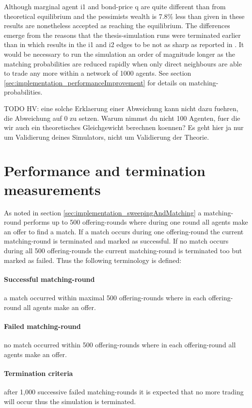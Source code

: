\documentclass[Bachelorarbeit.tex]{subfiles}
\begin{document}
Although marginal agent i1 and bond-price q are quite different than from theoretical equilibrium and the pessimists wealth is 7.8\% less than given in \cite{Breuer2015} these results are nonetheless accepted as reaching the equilibrium. The differences emerge from the reasons that the thesis-simulation runs were terminated earlier than in \cite{Breuer2015} which results in the i1 and i2 edges to be not as sharp as reported in \cite{Breuer2015}. It would be necessary to run the simulation an order of magnitude longer as the matching probabilities are reduced rapidly when only direct neighbours are able to trade any more within a network of 1000 agents. See section \ref{sec:implementation_performanceImprovement} for details on matching-probabilities.

TODO HV: eine solche Erklaerung einer Abweichung kann nicht dazu fuehren, die Abweichung auf 0 zu setzen. Warum nimmst du nicht 100 Agenten, fuer die wir auch ein theoretisches Gleichgewicht berechnen koennen? Es geht hier ja nur um Validierung deines Simulators, nicht um Validierung der Theorie.

\section{Performance and termination measurements}
As noted in section \ref{sec:implementation_sweepingAndMatching} a matching-round performs up to 500 offering-rounds where during one round all agents make an offer to find a match. If a match occurs during one offering-round the current matching-round is terminated and marked as successful. If no match occurs during all 500 offering-rounds the current matching-round is terminated too but marked as failed. Thus the following terminology is defined:

\paragraph{Successful matching-round} a match occurred within maximal 500 offering-rounds where in each offering-round all agents make an offer.
\paragraph{Failed matching-round} no match occurred within 500 offering-rounds where in each offering-round all agents make an offer.
\paragraph{Termination criteria} after 1,000 successive failed matching-rounds it is expected that no more trading will occur thus the simulation is terminated.
\end{document}
